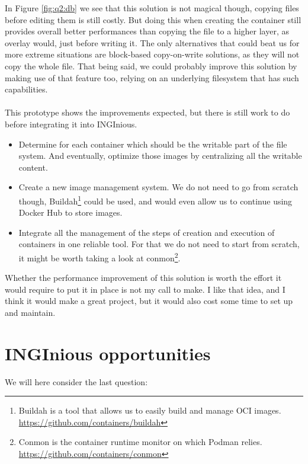 In Figure \ref{fig:q2:db} we see that this solution is not magical though, copying files before editing them is still costly.  But doing this when creating the container still provides overall better performances than copying the file to a higher layer, as overlay would, just before writing it.  The only alternatives that could beat us for more extreme situations are block-based copy-on-write solutions, as they will not copy the whole file.  That being said, we could probably improve this solution by making use of that feature too, relying on an underlying filesystem that has such capabilities.

\paragraph{}This prototype shows the improvements expected, but there is still work to do before integrating it into INGInious.
\begin{itemize}
  \item Determine for each container which should be the writable part of the file system.  And eventually, optimize those images by centralizing all the writable content.
  \item Create a new image management system.  We do not need to go from scratch though, Buildah\footnote{Buildah is a tool that allows us to easily build and manage OCI images. \href{https://github.com/containers/buildah}{https://github.com/containers/buildah}} could be used, and would even allow us to continue using Docker Hub to store images.
  \item Integrate all the management of the steps of creation and execution of containers in one reliable tool.  For that we do not need to start from scratch, it might be worth taking a look at conmon\footnote{Conmon is the container runtime monitor on which Podman relies.  \href{https://github.com/containers/conmon}{https://github.com/containers/conmon}}.
\end{itemize}

Whether the performance improvement of this solution is worth the effort it would require to put it in place is not my call to make. I like that idea, and I think it would make a great project, but it would also cost some time to set up and maintain.

\section{INGInious opportunities}
We will here consider the last question:
\begin{center}
\end{center}

